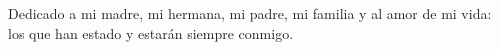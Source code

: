\begin{dedication}
    Dedicado a mi madre, mi hermana, mi padre, mi familia y al amor de mi vida: los que han estado y estarán siempre conmigo.
\end{dedication}